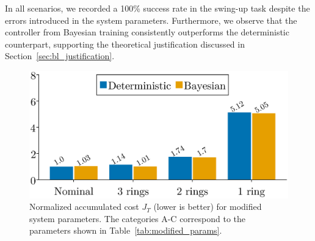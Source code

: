 In all scenarios, we recorded a 100\% success rate in the swing-up task despite
the errors introduced in the system parameters.
%
Furthermore, we observe that the controller from Bayesian training consistently
outperforms the deterministic counterpart, supporting the
theoretical justification discussed in Section~\ref{sec:bl_justification}. 
\begin{figure}[H]
    \centering
    \includegraphics[width=0.7\linewidth]{./figures/idapbc_bar.eps}
    \caption{
        Normalized accumulated cost $J_{T}$ (lower is better) for
        modified system parameters.
        The categories A-C correspond to the parameters shown in
        Table~\ref{tab:modified_params}.
    }
    \label{fig:neuralidapbc_bar_plot}
\end{figure}
%

